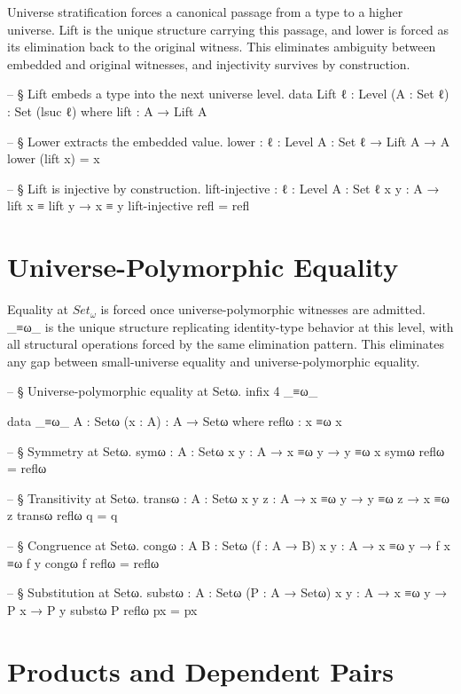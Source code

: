 \documentclass[11pt,a4paper]{book}
\def\texttt#1{#1}%
\begin{document}
Universe stratification forces a canonical passage from a type to a higher universe.
\texttt{Lift} is the unique structure carrying this passage, and \texttt{lower} is forced as its elimination back to the original witness.
This eliminates ambiguity between embedded and original witnesses, and injectivity survives by construction.

\begin{code}
-- § Lift embeds a type into the next universe level.
data Lift {ℓ : Level} (A : Set ℓ) : Set (lsuc ℓ) where
  lift : A → Lift A

-- § Lower extracts the embedded value.
lower : {ℓ : Level} {A : Set ℓ} → Lift A → A
lower (lift x) = x

-- § Lift is injective by construction.
lift-injective : {ℓ : Level} {A : Set ℓ} {x y : A} → lift x ≡ lift y → x ≡ y
lift-injective refl = refl
\end{code}

\section{Universe-Polymorphic Equality}

Equality at $\mathit{Set}_\omega$ is forced once universe-polymorphic witnesses are admitted.
\texttt{\_≡ω\_} is the unique structure replicating identity-type behavior at this level, with all structural operations forced by the same elimination pattern.
This eliminates any gap between small-universe equality and universe-polymorphic equality.

\begin{code}
-- § Universe-polymorphic equality at Setω.
infix 4 _≡ω_

data _≡ω_ {A : Setω} (x : A) : A → Setω where
  reflω : x ≡ω x

-- § Symmetry at Setω.
symω : {A : Setω} {x y : A} → x ≡ω y → y ≡ω x
symω reflω = reflω

-- § Transitivity at Setω.
transω : {A : Setω} {x y z : A} → x ≡ω y → y ≡ω z → x ≡ω z
transω reflω q = q

-- § Congruence at Setω.
congω : {A B : Setω} (f : A → B) {x y : A} → x ≡ω y → f x ≡ω f y
congω f reflω = reflω

-- § Substitution at Setω.
substω : {A : Setω} (P : A → Setω) {x y : A} → x ≡ω y → P x → P y
substω P reflω px = px
\end{code}

\section{Products and Dependent Pairs}
\end{document}
